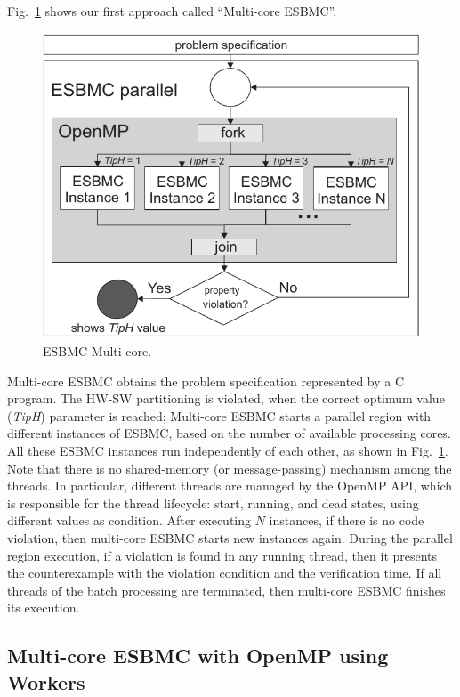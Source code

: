 Fig.~\ref{ESBMC-Multi-core} shows our first approach called ``Multi-core ESBMC''.
%
\begin{figure}[ht]
	\centering
  \includegraphics[scale=0.75]{Image/esbmc-parallel.pdf} 
	\caption{ESBMC Multi-core.}
	\label{ESBMC-Multi-core}
\end{figure}

Multi-core ESBMC obtains the problem specification represented by a C program. The HW-SW partitioning is violated, when the correct optimum value (\textit{TipH}) parameter is reached; Multi-core ESBMC starts a parallel region with different instances of ESBMC, based on the number of available processing cores. All these ESBMC instances run independently of each other, as shown in Fig.~\ref{ESBMC-Multi-core}. Note that there is no shared-memory (or message-passing) mechanism among the threads. In particular, different threads are managed by the OpenMP API, which is responsible for the thread lifecycle: start, running, and dead states, using different values as condition. After executing $N$ instances, if there is no code violation, then multi-core ESBMC starts new instances again. During the parallel region execution, if a violation is found in any running thread, then it presents the counterexample with the violation condition and the verification time. If all threads of the batch processing are terminated, then multi-core ESBMC finishes its execution.

\subsection{Multi-core ESBMC with OpenMP using Workers}
\label{Multi-core-ESBMC-with-OpenMP-using-workers}

